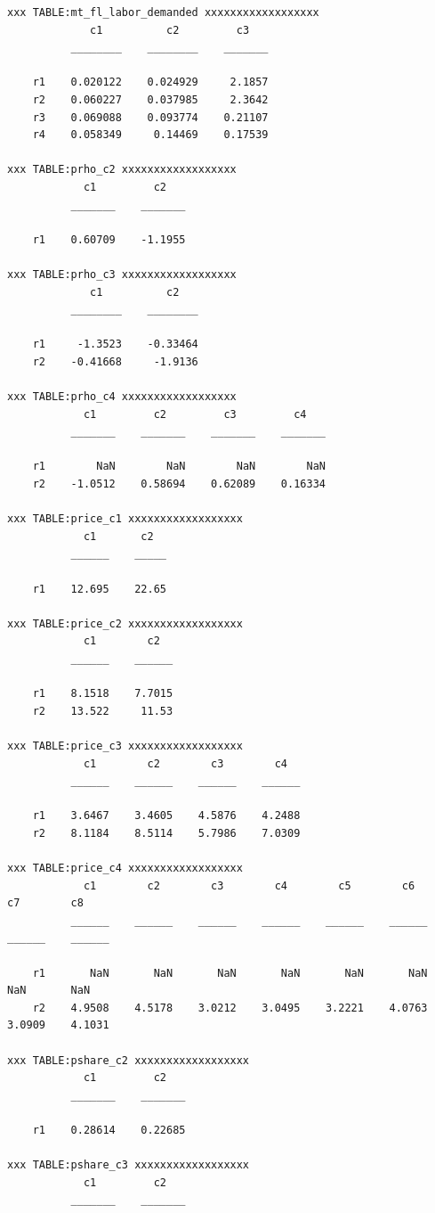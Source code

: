 \documentclass[
]{book}
\begin{document}
\begin{verbatim}
xxx TABLE:mt_fl_labor_demanded xxxxxxxxxxxxxxxxxx
             c1          c2         c3   
          ________    ________    _______

    r1    0.020122    0.024929     2.1857
    r2    0.060227    0.037985     2.3642
    r3    0.069088    0.093774    0.21107
    r4    0.058349     0.14469    0.17539

xxx TABLE:prho_c2 xxxxxxxxxxxxxxxxxx
            c1         c2   
          _______    _______

    r1    0.60709    -1.1955

xxx TABLE:prho_c3 xxxxxxxxxxxxxxxxxx
             c1          c2   
          ________    ________

    r1     -1.3523    -0.33464
    r2    -0.41668     -1.9136

xxx TABLE:prho_c4 xxxxxxxxxxxxxxxxxx
            c1         c2         c3         c4   
          _______    _______    _______    _______

    r1        NaN        NaN        NaN        NaN
    r2    -1.0512    0.58694    0.62089    0.16334

xxx TABLE:price_c1 xxxxxxxxxxxxxxxxxx
            c1       c2  
          ______    _____

    r1    12.695    22.65

xxx TABLE:price_c2 xxxxxxxxxxxxxxxxxx
            c1        c2  
          ______    ______

    r1    8.1518    7.7015
    r2    13.522     11.53

xxx TABLE:price_c3 xxxxxxxxxxxxxxxxxx
            c1        c2        c3        c4  
          ______    ______    ______    ______

    r1    3.6467    3.4605    4.5876    4.2488
    r2    8.1184    8.5114    5.7986    7.0309

xxx TABLE:price_c4 xxxxxxxxxxxxxxxxxx
            c1        c2        c3        c4        c5        c6        c7        c8  
          ______    ______    ______    ______    ______    ______    ______    ______

    r1       NaN       NaN       NaN       NaN       NaN       NaN       NaN       NaN
    r2    4.9508    4.5178    3.0212    3.0495    3.2221    4.0763    3.0909    4.1031

xxx TABLE:pshare_c2 xxxxxxxxxxxxxxxxxx
            c1         c2   
          _______    _______

    r1    0.28614    0.22685

xxx TABLE:pshare_c3 xxxxxxxxxxxxxxxxxx
            c1         c2   
          _______    _______


\end{verbatim}
\end{document}
